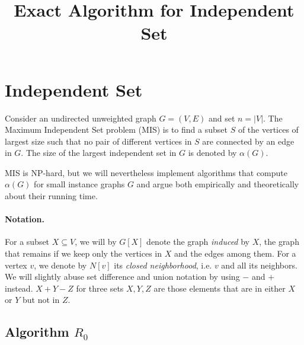 \documentclass{tufte-handout}
\title{\sf Exact Algorithm for Independent Set}
\date{}
\author{}
\begin{document}
\maketitle

\section{Independent Set}
Consider an undirected unweighted graph $G=(V,E)$ and set $n=|V|$.
The Maximum Independent Set problem (MIS) is to find a subset $S$ of
the vertices of largest size such that no pair of different vertices
in $S$ are connected by an edge in $G$.
The size of the largest independent set in $G$ is denoted by
$\alpha(G)$.

MIS is NP-hard, but we will nevertheless implement algorithms that
compute $\alpha(G)$ for small instance graphs $G$ and argue both
empirically and theoretically about their running time.

\paragraph{Notation.}
For a subset $X\subseteq V$, we will by $G[X]$ denote the graph
\emph{induced} by $X$, the graph that remains if we keep only the
vertices in $X$ and the edges among them.
For a vertex $v$, we denote by $N[v]$ its \emph{closed neighborhood},
i.e. $v$ and all its neighbors.
We will slightly abuse set difference and union notation by using $-$
and $+$ instead.
$X+Y-Z$ for three sets $X,Y,Z$ are those elements that are in either
$X$ or $Y$ but not in $Z$.


\subsection{Algorithm $R_0$}
\end{document}
